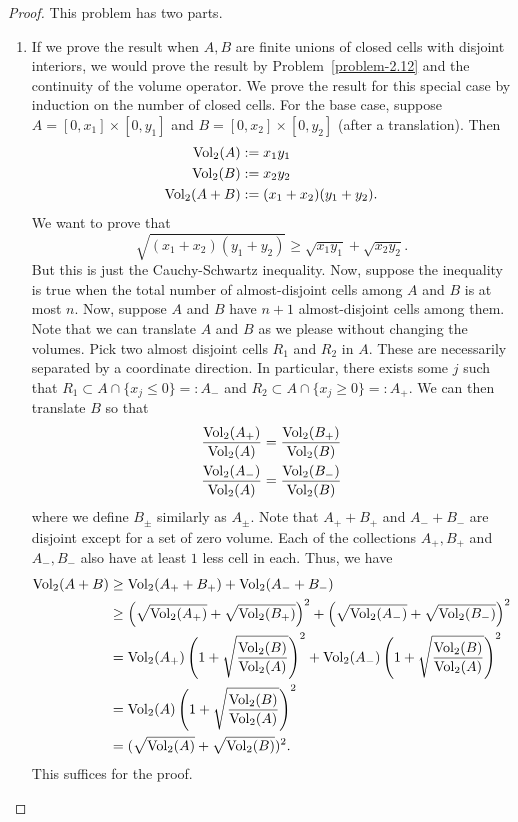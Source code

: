 \documentclass[12pt]{article}
\begin{document}
\begin{proof}
	This problem has two parts. 
	\begin{enumerate}[label = (\alph*)]
		\item If we prove the result when $A, B$ are finite unions of closed cells with disjoint interiors, we would prove the result by Problem~\ref{problem-2.12} and the continuity of the volume operator. We prove the result for this special case by induction on the number of closed cells. For the base case, suppose $A = [0, x_1] \times [0, y_1]$ and $B = [0, x_2] \times [0, y_2]$ (after a translation). Then 
		\begin{align*}
			\operatorname{Vol}_2(A) & := x_1y_1 \\
			\operatorname{Vol}_2(B) & := x_2y_2 \\
			\operatorname{Vol}_2(A + B) & := (x_1 + x_2)(y_1 + y_2). 
		\end{align*}
		We want to prove that 
		\[
			\sqrt{(x_1 + x_2)(y_1 + y_2)} \geq \sqrt{x_1y_1} + \sqrt{x_2y_2}.
		\]
		But this is just the Cauchy-Schwartz inequality. Now, suppose the inequality is true when the total number of almost-disjoint cells among $A$ and $B$ is at most $n$. Now, suppose $A$ and $B$ have $n+1$ almost-disjoint cells among them. Note that we can translate $A$ and $B$ as we please without changing the volumes. Pick two almost disjoint cells $R_1$ and $R_2$ in $A$. These are necessarily separated by a coordinate direction. In particular, there exists some $j$ such that $R_1 \subset A \cap \{x_j \leq 0\} =: A_-$ and $R_2 \subset A \cap \{x_j \geq 0\} =: A_+$. We can then translate $B$ so that 
		\begin{align*}
			\frac{\operatorname{Vol}_2(A_+)}{\operatorname{Vol}_2(A)} & = \frac{\operatorname{Vol}_2(B_+)}{\operatorname{Vol}_2(B)} \\
			\frac{\operatorname{Vol}_2(A_-)}{\operatorname{Vol}_2(A)} & = \frac{\operatorname{Vol}_2(B_-)}{\operatorname{Vol}_2(B)}
		\end{align*}
		where we define $B_{\pm}$ similarly as $A_{\pm}$. Note that $A_+ + B_+$ and $A_- + B_-$ are disjoint except for a set of zero volume. Each of the collections $A_+, B_+$ and $A_-, B_-$ also have at least $1$ less cell in each. Thus, we have
		\begin{align*}
			\operatorname{Vol}_2(A + B) & \geq \operatorname{Vol}_2(A_+ + B_+) + \operatorname{Vol}_2(A_- + B_-) \\
			& \geq \left ( \sqrt{\operatorname{Vol}_2(A_+)} + \sqrt{\operatorname{Vol}_2(B_+)} \right )^2 + \left (\sqrt{\operatorname{Vol}_2(A_-)} + \sqrt{\operatorname{Vol}_2(B_-)} \right )^2 \\
			& = \operatorname{Vol}_2(A_+) \left (1 + \sqrt{\frac{\operatorname{Vol}_2(B)}{\operatorname{Vol}_2(A)}} \right )^2 + \operatorname{Vol}_2(A_-) \left ( 1 + \sqrt{\frac{\operatorname{Vol}_2(B)}{\operatorname{Vol}_2(A)}} \right )^2 \\
			& = \operatorname{Vol}_2(A) \left (1 + \sqrt{\frac{\operatorname{Vol}_2(B)}{\operatorname{Vol}_2(A)}} \right )^2 \\
			& = (\sqrt{\operatorname{Vol}_2(A)} + \sqrt{\operatorname{Vol}_2(B)})^2.
		\end{align*}
		This suffices for the proof. 


\end{enumerate}
\end{proof}
\end{document}
